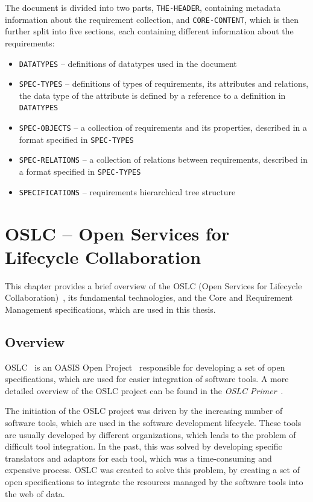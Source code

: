 The document is divided into two parts, \texttt{THE-HEADER}, containing metadata information about the requirement collection, and \texttt{CORE-CONTENT}, which is then further split into five sections, each containing different information about the requirements:

\begin{itemize}
  \item \texttt{DATATYPES} -- definitions of datatypes used in the document
  \item \texttt{SPEC-TYPES} -- definitions of types of requirements, its attributes and relations, the data type of the attribute is defined by a reference to a definition in \texttt{DATATYPES}
  \item \texttt{SPEC-OBJECTS} -- a collection of requirements and its properties, described in a format specified in \texttt{SPEC-TYPES}
  \item \texttt{SPEC-RELATIONS} -- a collection of relations between requirements, described in a format specified in \texttt{SPEC-TYPES}
  \item \texttt{SPECIFICATIONS} -- requirements hierarchical tree structure
\end{itemize}


\chapter{OSLC -- Open Services for Lifecycle Collaboration}
\label{chapter:oslc}
This chapter provides a brief overview of the OSLC (Open Services for Lifecycle Collaboration) \cite{oslc}, its fundamental technologies, and the Core and Requirement Management specifications, which are used in this thesis.

\section{Overview}
OSLC \cite{oslc} is an OASIS Open Project \cite{oasis_open} responsible for developing a set of open specifications, which are used for easier integration of software tools. A more detailed overview of the OSLC project can be found in the \emph{OSLC Primer} \cite{oslc_primer}.

The initiation of the OSLC project was driven by the increasing number of software tools, which are used in the software development lifecycle. These tools are usually developed by different organizations, which leads to the problem of difficult tool integration. In the past, this was solved by developing specific translators and adaptors for each tool, which was a time-consuming and expensive process. OSLC was created to solve this problem, by creating a set of open specifications to integrate the resources managed by the software tools into the web of data.

